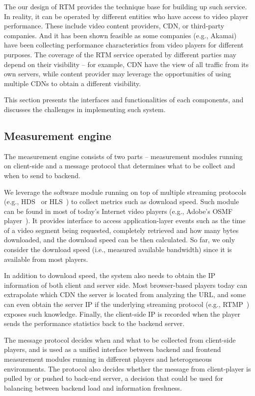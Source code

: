 The our design of RTM provides the technique base for building up such service. In reality, it can be operated by different entities who have access to video player performance. These include video content providers, CDN, or third-party companies. And it has been shown feasible as some companies (e.g., Akamai) have been collecting performance characteristics from video players for different purposes. The coverage of the RTM service operated by different parties may depend on their visibility -- for example, CDN have the view of all traffic from its own servers, while content provider may leverage the opportunities of using multiple CDNs to obtain a different visibility.

This section presents the interfaces and functionalities of each components, and discusses the challenges in implementing such system.

\subsection{Measurement engine}

The measurement engine consists of two parts -- measurement modules running on client-side and a message protocol that determines what to be collect and when to send to backend.

 We leverage the software module running on top of multiple streaming protocols (e.g., HDS~\cite{} or HLS~\cite{}) to collect metrics such as download speed. Such module can be found in most of today's Internet video players (e.g., Adobe's OSMF player~\cite{}). It provides interface to access application-layer events such as the time of a video segment being requested, completely retrieved and how many bytes downloaded, and the download speed can be then calculated. So far, we only consider the download speed (i.e., measured available bandwidth) since it is available from most players.

 In addition to download speed, the system also needs to obtain the IP information of both client and server side. Most browser-based players today can extrapolate which CDN the server is located from analyzing the URL, and some can even obtain the server IP if the underlying streaming protocol (e.g., RTMP~\cite{}) exposes such knowledge. Finally, the client-side IP is recorded when the player sends the performance statistics back to the backend server.

 The message protocol decides when and what to be collected from client-side players, and is used as a unified interface between backend and frontend measurement modules running in different players and heterogeneous environments. The protocol also decides whether the message from client-player is pulled by or pushed to back-end server, a decision that could be used for balancing between backend load and information freshness.


